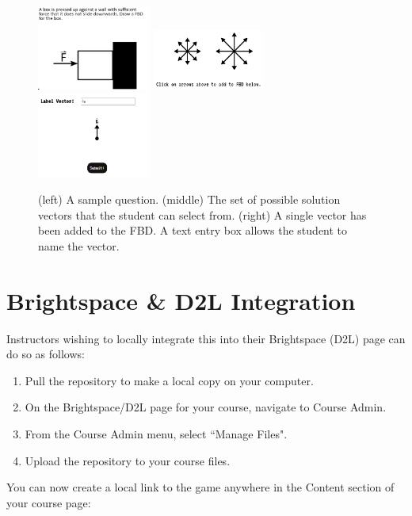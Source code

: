 \documentclass[12pt]{article}
\begin{document}
\begin{figure}[H]
    \centering
    \includegraphics[width=0.33\textwidth]{QuestionPanel.png}
    \includegraphics[width=0.33\textwidth]{vectorPanel.png}
    \includegraphics[width=0.33\textwidth]{answerPanel.png}
    \caption{(left) A sample question. (middle) The set of possible solution vectors that the student can select from. (right) A single vector has been added to the FBD. A text entry box allows the student to name the vector.}
\end{figure}

\section{Brightspace \& D2L Integration}
Instructors wishing to locally integrate this into their Brightspace (D2L) page can do so as follows:\par

\begin{enumerate}[leftmargin=16pt,noitemsep]
\item Pull the repository to make a local copy on your computer.
\item On the Brightspace/D2L page for your course, navigate to Course Admin.
\item From the Course Admin menu, select ``Manage Files".
\item Upload the repository to your course files.
\end{enumerate}

You can now create a local link to the game anywhere in the Content section of your course page:\par
\end{document}
